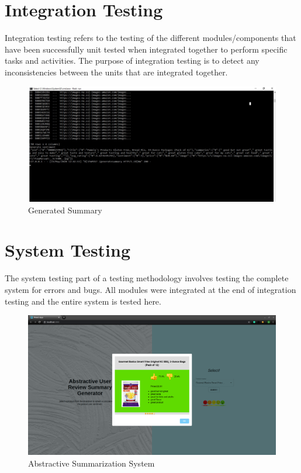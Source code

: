 \documentclass[11pt]{report}
\begin{document}
\section{Integration Testing}
Integration testing refers to the testing of the different modules/components that have been successfully unit tested when integrated together to perform specific tasks and activities. The purpose of integration testing is to detect any inconsistencies between the units that are integrated together.
\begin{figure}[H]
\centering
\includegraphics[scale=0.5]{images/IntegrationTesting.png}
\caption{Generated Summary}
\label{fig:integration}
\end{figure}

\section{System Testing}
The system testing part of a testing methodology involves testing the complete system for errors and bugs. All modules were integrated at the end of integration testing and the entire system is tested here.
\begin{figure}[H]
\centering
\includegraphics[scale=0.27]{images/FinalOutput.png}
\caption{Abstractive Summarization System}
\label{fig:finaloutput}
\end{figure}
\end{document}
